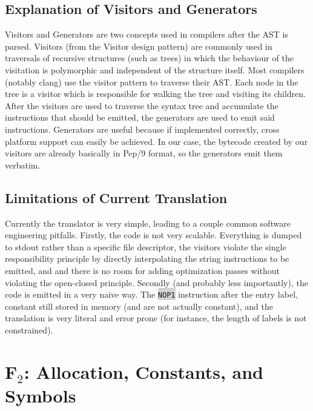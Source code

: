 \documentclass[12pt]{article}
\newcommand{\code}[1]{\colorbox{LightGray}{\texttt{#1}}}
\begin{document}
\subsection*{Explanation of Visitors and Generators}
Visitors and Generators are two concepts used in compilers after the AST is parsed. Visitors (from the Visitor design pattern) are commonly used in traversals of recursive structures (such as trees) in which the behaviour of the visitation is polymorphic and independent of the structure itself. Most compilers (notably clang) use the visitor pattern to traverse their AST. Each node in the tree is a visitor which is responsible for walking the tree and visiting its children. After the visitors are used to traverse the syntax tree and accumulate the instructions that should be emitted, the generators are used to emit said instructions. Generators are useful because if implemented correctly, cross platform support can easily be achieved. In our case, the bytecode created by our visitors are already basically in Pep/9 format, so the generators emit them verbatim.

\subsection*{Limitations of Current Translation}
Currently the translator is very simple, leading to a couple common software engineering pitfalls. Firstly, the code is not very scalable. Everything is dumped to stdout rather than a specific file descriptor, the visitors violate the single responsibility principle by directly interpolating the string instructions to be emitted, and and there is no room for adding optimization passes without violating the open-closed principle. Secondly (and probably less importantly), the code is emitted in a very naive way. The \code{NOP1} instruction after the entry label, constant still stored in memory (and are not actually constant), and the translation is very literal and error prone (for instance, the length of labels is not constrained).


\section*{F$_2$: Allocation, Constants, and Symbols}
\end{document}
